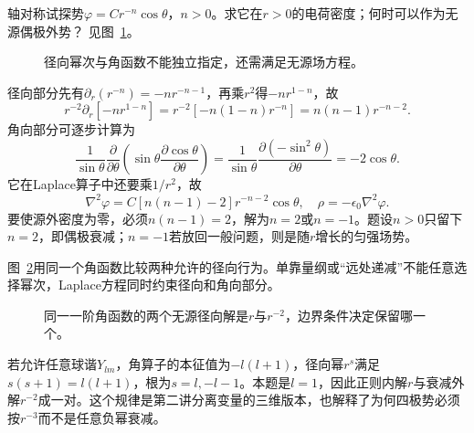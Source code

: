 \begin{exercise}[势的角向因子与场的衰减]\label{ex:es1-h14}
轴对称试探势$\varphi=C r^{-n}\cos\theta$，$n>0$。求它在$r>0$的电荷密度；何时可以作为无源偶极外势？ 见图~\ref{fig:es1-h14-q}。
\end{exercise}

\begin{figure}[H]\centering
{}
\caption{径向幂次与角函数不能独立指定，还需满足无源场方程。}\label{fig:es1-h14-q}
\end{figure}
\begin{solution}
径向部分先有$\partial_r(r^{-n})=-nr^{-n-1}$，再乘$r^2$得$-nr^{1-n}$，故
\[r^{-2}\partial_r[-nr^{1-n}]=r^{-2}[-n(1-n)r^{-n}]=n(n-1)r^{-n-2}.\]
角向部分可逐步计算为
\[\frac1{\sin\theta}\frac{\partial}{\partial\theta}
\left(\sin\theta\frac{\partial\cos\theta}{\partial\theta}\right)
=\frac1{\sin\theta}\frac{\partial(-\sin^2\theta)}{\partial\theta}
=-2\cos\theta.
\]
它在Laplace算子中还要乘$1/r^2$，故
\[\nabla^2\varphi=C[n(n-1)-2]r^{-n-2}\cos\theta,
\quad\rho=-\epsilon_0\nabla^2\varphi.\]
要使源外密度为零，必须$n(n-1)=2$，解为$n=2$或$n=-1$。题设$n>0$只留下$n=2$，即偶极衰减；$n=-1$若放回一般问题，则是随$r$增长的匀强场势。

图~\ref{fig:es1-h14-s}用同一个角函数比较两种允许的径向行为。单靠量纲或“远处递减”不能任意选择幂次，Laplace方程同时约束径向和角向部分。
\begin{figure}[H]\centering
{}
\caption{同一一阶角函数的两个无源径向解是$r$与$r^{-2}$，边界条件决定保留哪一个。}\label{fig:es1-h14-s}
\end{figure}


若允许任意球谐$Y_{lm}$，角算子的本征值为$-l(l+1)$，径向幂$r^s$满足$s(s+1)=l(l+1)$，根为$s=l,-l-1$。本题是$l=1$，因此正则内解$r$与衰减外解$r^{-2}$成一对。这个规律是第二讲分离变量的三维版本，也解释了为何四极势必须按$r^{-3}$而不是任意负幂衰减。
\end{solution}


